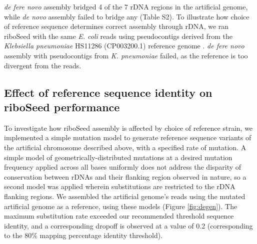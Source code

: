 \documentclass[a4,center,fleqn]{NAR}
\begin{document}
\textit{de fere novo} assembly bridged 4 of the 7 rDNA regions in the artificial genome, while \textit{de novo} assembly failed to bridge any (Table S2). To illustrate how choice of reference sequence determines correct assembly through rDNA, we ran riboSeed with the same \textit{E. coli} reads using pseudocontigs derived from the \textit{Klebsiella pneumoniae} HS11286 (CP003200.1) reference genome \cite{Liu2012}. \textit{de fere novo} assembly with pseudocontigs from \textit{K. pneumoniae} failed, as the reference is too divergent from the reads.


\subsection*{Effect of reference sequence identity on riboSeed performance}
To investigate how riboSeed assembly is affected by choice of reference strain, we implemented a simple mutation model to generate reference sequence variants of the artificial chromosome described above, with a specified rate of mutation. A simple model of geometrically-distributed mutations at a desired mutation frequency applied across all bases uniformly does not address the disparity of conservation between rDNAs and their flanking region observed in nature, so a second model was applied wherein substitutions are restricted to the rDNA flanking regions. We assembled the artificial genome's reads using the mutated artificial genome as a reference, using these models (Figure \ref{fig:degen}). The maximum substitution rate exceeded our recommended threshold sequence identity, and a corresponding dropoff is observed at a value of 0.2 (corresponding to the 80\% mapping percentage identity threshold).
\end{document}
